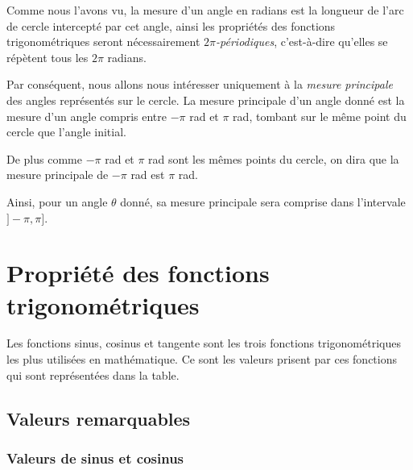 \documentclass[a4paper]{article}
\begin{document}
			\medbreak

			Comme nous l'avons vu, la mesure d'un angle en radians est la longueur de 
			l'arc de cercle intercepté par cet angle,
			ainsi les propriétés des fonctions trigonométriques 
			seront nécessairement \emph{$2\pi$-périodiques},
			c'est-à-dire qu'elles se répètent tous les $2 \pi$ radians.

			Par conséquent, nous allons nous intéresser uniquement à la \emph{mesure principale} 
			des angles représentés sur le cercle.
			La mesure principale d'un angle donné est la mesure
			d'un angle compris entre $-\pi$ rad et $\pi$ rad,
			tombant sur le même point du cercle que l'angle initial.

			De plus comme $-\pi$ rad et $\pi$ rad sont les mêmes points du cercle,
			on dira que la mesure principale de $-\pi$ rad est $\pi$ rad.
			
			Ainsi, pour un angle $\theta$ donné,
			sa mesure principale sera comprise dans l'intervale $]-\pi, \pi]$.

\newpage

	\section{Propriété des fonctions trigonométriques}

		Les fonctions sinus, cosinus et tangente sont les trois fonctions trigonométriques
		les plus utilisées en mathématique. Ce sont les valeurs prisent par ces fonctions
		qui sont représentées dans la table.

		\subsection{Valeurs remarquables}

			\subsubsection*{Valeurs de sinus et cosinus}
\end{document}
